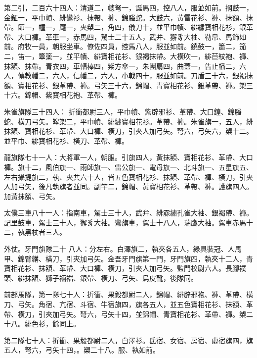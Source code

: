 \begin{pinyinscope}
 第二引，二百六十四人：清道二，幰弩一，誕馬四，控八人，服並如前。㧏鼓一，金鉦一，平巾幘、緋鸞衫、抹帶、褲、錦螣蛇。大鼓六，黃雷花衫、褲、抹額、抹帶。節一，幢一，麾一，夾槊二，角四，儀刀十，並平巾幘、緋繡寶相花衫，銀革帶、大口褲。革車一，赤馬四，駕士二十五人，武弁、獬豸大袖、勒帛、馬飾如前。府牧一員，朝服坐車。僚佐四員，控馬八人，服並如前。鐃鼓一，簫二，笳二，笛一，篳篥一，並平幘、緋寶相花衫、銀褐抹帶。大橫吹一，緋苣紋袍、褲、抹額、抹帶。青衣四，車輻棒四，紫方傘一，朱團扇四，曲蓋一，告止幡二，六人，傳教幡二，六人，信幡二，六人，小戟四十，服並如前。刀盾三十六，銀褐抹額、寶相花衫、銀革帶、褲。弓矢三十六，錦帽、青寶相花衫、銀革帶、褲。槊三十六。錦帽、紫寶相花袍、革帶、褲。



 朱雀旗隊三十四人：
 折衝都尉三人，平巾幘、紫辟邪衫、革帶、大口鍠、錦螣蛇、橫刀弓矢。皞槊二，平巾幘、緋繡寶相花衫。革帶、褲。朱雀旗一，五人，緋抹額、寶相花衫、革帶、大口褲、橫刀，引夾人加弓矢。弩六，弓矢六，槊十二。並平巾、緋寶相花衫、橫刀、革帶、褲。



 龍旗隊七十一人：大將軍一人，朝服。引旗四人，黃抹額、寶相花衫、革帶、大口褲。旗十二，風伯旗一、雨師旗一、雷公旗一、電母旗一、北斗旗一、五星旗五、左右攝提旗二，執、夾共六十人，皆五色寶相花衫、抹額、革帶、褲、橫刀，引夾人加弓矢，後凡執旗者並同。副竿二，錦帽、黃寶相花衫、革帶、褲。護旗四人。加黃抹額、弓矢。



 太僕三車八十一人：指南車，駕士三十人，武弁、緋霡繡孔雀大袖、銀褐帶、褲。記里鼓車，駕士三十人，獬豸大袖。鸞旗車，駕士十八人，瑞鷹大袖。駕車赤馬十二，執黑杖者三人。



 外仗。牙門旗隊二十
 八人：分左右。白澤旗二，執夾各五人，綠具裝冠、人馬甲、錦臂韝、橫刀，引夾加弓矢。金吾牙門旗第一門，牙門旗四，執夾十二人，青寶相花衫、抹額、革帶、大口褲、橫刀，引夾人加弓矢。監門校尉六人。長腳襆頭、緋抹額、獅子裲襠、銀帶、橫刀、弓矢、烏皮靴，後隊同。



 前部馬隊，第一隊七十人：折衝、果毅都尉二人，錦帽、緋辟邪袍、褲、革帶、橫刀、弓矢。角宿、亢宿、斗宿、牛宿旗四，旗各五人，並五色寶相花衫、抹額、革帶、橫刀，引夾加弓矢。弩六，弓矢十四，並錦帽、青寶相花衫、革帶、褲。槊二十八。緋色衫，餘同上。



 第二隊七十人：折衝、果毅都尉二人，白澤衫。氐宿、女宿、房宿、虛宿旗四，旗五人，弩六，弓矢十四，。槊二十八。服、執如前。




\end{pinyinscope}
